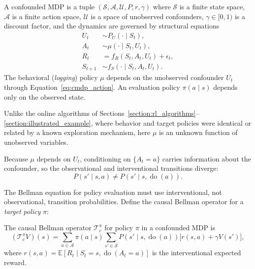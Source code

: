 \begin{definition}
\label{def:confounded_mdp}
A confounded MDP is a tuple $(\mathcal{S}, \mathcal{A}, \mathcal{U}, P, r, \gamma)$ where $\mathcal{S}$ is a finite state space, $\mathcal{A}$ is a finite action space, $\mathcal{U}$ is a space of unobserved confounders, $\gamma \in [0,1)$ is a discount factor, and the dynamics are governed by structural equations
\begin{align}
U_t &\sim P_U(\cdot \mid S_t), \label{eq:cmdp_confounder} \\
A_t &\sim \mu(\cdot \mid S_t, U_t), \label{eq:cmdp_action} \\
R_t &= f_R(S_t, A_t, U_t) + \epsilon_t, \label{eq:cmdp_reward} \\
S_{t+1} &\sim f_S(\cdot \mid S_t, A_t, U_t). \label{eq:cmdp_transition}
\end{align}
The behavioral (\textit{logging}) policy $\mu$ depends on the unobserved confounder $U_t$ through Equation~\eqref{eq:cmdp_action}. An evaluation policy $\pi(a \mid s)$ depends only on the observed state.
\end{definition}

Unlike the online algorithms of Sections~\ref{section:rl_algorithms}--\ref{section:illustrated_example}, where behavior and target policies were identical or related by a known exploration mechanism, here $\mu$ is an unknown function of unobserved variables.

Because $\mu$ depends on $U_t$, conditioning on $\{A_t = a\}$ carries information about the confounder, so the observational and interventional transitions diverge:
\begin{equation}
P(s' \mid s, a) \neq P(s' \mid s, \operatorname{do}(a)).
\label{eq:obs_vs_interventional}
\end{equation}

The Bellman equation for policy evaluation must use interventional, not observational, transition probabilities. Define the causal Bellman operator for a \textit{target policy} $\pi$:

\begin{definition}
\label{def:causal_bellman}
The causal Bellman operator $\mathcal{T}_c^\pi$ for policy $\pi$ in a confounded MDP is
\begin{equation}
(\mathcal{T}_c^\pi V)(s) = \sum_{a \in \mathcal{A}} \pi(a \mid s) \sum_{s' \in \mathcal{S}} P(s' \mid s, \operatorname{do}(a)) \bigl[ r(s, a) + \gamma V(s') \bigr],
\label{eq:causal_bellman}
\end{equation}
where $r(s,a) = \mathbb{E}[R_t \mid S_t = s, \operatorname{do}(A_t = a)]$ is the interventional expected reward.
\end{definition}

